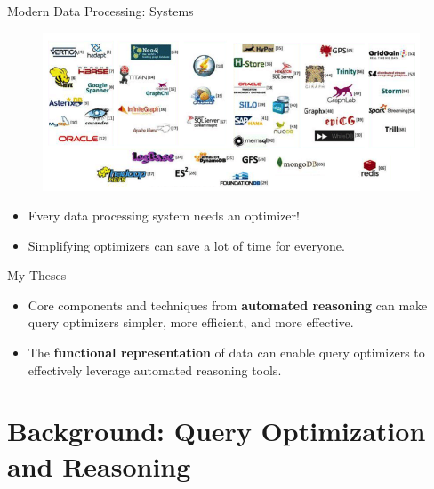 \documentclass{beamer}
\begin{document}
  \begin{frame}{Modern Data Processing: Systems}
    \begin{figure}
    \includegraphics[width=\linewidth]{systems.png}
    \end{figure}
    \begin{itemize}
      \item Every data processing system needs an optimizer!
      \item Simplifying optimizers can save a lot of time for everyone.
    \end{itemize}
  \end{frame}

  \begin{frame}{My Theses}
    \begin{itemize}
      \item Core components and techniques from \textbf{automated reasoning}
      can make query optimizers simpler, more efficient,
      and more effective. \pause
      \item The \textbf{functional representation} of data can enable query 
      optimizers to effectively leverage automated reasoning tools.
    \end{itemize}
  \end{frame}

  \section{Background: Query Optimization and Reasoning}
\end{document}
